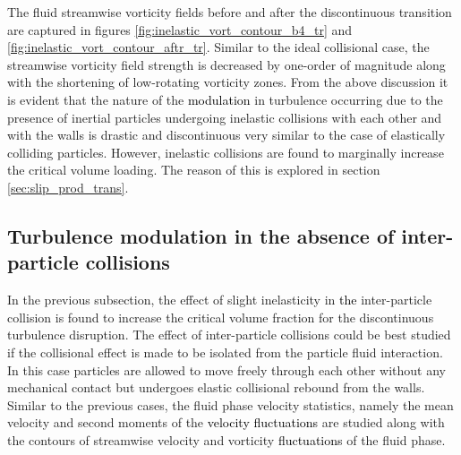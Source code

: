 \documentclass[aip,graphicx]{revtex4-1}
\begin{document}
The fluid streamwise vorticity fields before and after the discontinuous transition are captured in figures \ref{fig:inelastic_vort_contour_b4_tr} and \ref{fig:inelastic_vort_contour_aftr_tr}. Similar to the ideal collisional case, the streamwise vorticity field strength is decreased by one-order of magnitude along with the shortening of low-rotating vorticity zones.
From the above discussion it is evident that the nature of the \textcolor{black}{modulation} in turbulence occurring due to the presence of inertial particles undergoing inelastic collisions with each other and with the walls is drastic and discontinuous very similar to the case of elastically colliding particles. However, inelastic collisions are found to marginally increase the critical volume loading. The reason of this is explored in section \ref{sec:slip_prod_trans}. 
\subsection{Turbulence modulation in the absence of inter-particle collisions}
\label{sec:zero_coll}
In the previous subsection, the effect of slight inelasticity in \textcolor{black}{the} inter-particle collision is found to increase the critical volume fraction for the discontinuous turbulence disruption. The effect of inter-particle collisions could be best studied if the collisional effect is made to be isolated from the particle fluid interaction. 
In this case particles are allowed to move freely through each other without any mechanical contact but undergoes elastic collisional rebound from the walls. Similar to the previous cases, the fluid phase velocity statistics, namely the mean velocity and second moments of the \textcolor{black}{velocity fluctuations} are studied along with the contours of streamwise velocity and vorticity \textcolor{black}{fluctuations} of the fluid phase. 
\end{document}
